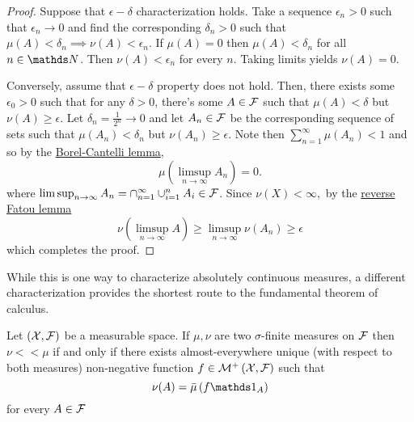 \begin{proof}
Suppose that $\epsilon-\delta$ characterization holds. Take a sequence
$\epsilon_{n}>0$ such that $\epsilon_{n}\to0$ and find the corresponding
$\delta_{n}>0$ such that $\mu(A)<\delta_{n}\implies\nu(A)<\epsilon_{n}$.
If $\mu(A)=0$ then $\mu(A)<\delta_{n}$ for all $n\in\N$. Then $\nu(A)<\epsilon_{n}$
for every $n.$ Taking limits yields $\nu(A)=0.$

Conversely, assume that $\epsilon-\delta$ property does not hold.
Then, there exists some $\epsilon_{0}>0$ such that for any $\delta>0$,
there's some $A\in\mathcal{F}$ such that $\mu(A)<\delta$ but $\nu(A)\geq\epsilon$.
Let $\delta_{n}=\frac{1}{2^{n}}\to0$ and let $A_{n}\in\mathcal{F}$ be the
corresponding sequence of sets such that $\mu(A_{n})<\delta_{n}$
but $\nu(A_{n})\geq\epsilon.$ Note then $\sum_{n=1}^{\infty}\mu(A_{n})<1$
and so by the \hyperref[thm:borelCantelli]{Borel-Cantelli lemma},
\[
\mu(\limsup_{n\to\infty}A_{n})=0.
\]
where $\limsup_{n\to\infty}A_{n}=\cap_{n=1}^{\infty}\cup_{i=1}^{n}A_{i}\in\mathcal{F}$.
Since $\nu(X)<\infty,$ by the \hyperref[cor:reverseFatouLemma]{reverse Fatou lemma}
\[
\nu(\limsup_{n\to\infty}A)\geq\limsup_{n\to\infty}\nu(A_{n})\geq\epsilon
\]
which completes the proof.
\end{proof}
While this is one way to characterize absolutely continuous measures,
a different characterization provides the shortest route to the fundamental
theorem of calculus.
\begin{thm}
\label{thm:radonNikodym}Let $\left(\mathcal{X},\mathcal{F}\right)$ be a measurable
space. If $\mu,\nu$ are two $\sigma$-finite measures on $\mathcal{F}$ then
$\nu<<\mu$ if and only if there exists almost-everywhere unique (with
respect to both measures) non-negative function $f\in\mathcal{M}^{+}\left(\mathcal{X},\mathcal{F}\right)$
such that 
\[
\nu(A)=\lebInt{\mu}{f\indicate_{A}}
\]
for every $A\in\mathcal{F}$
\end{thm}

